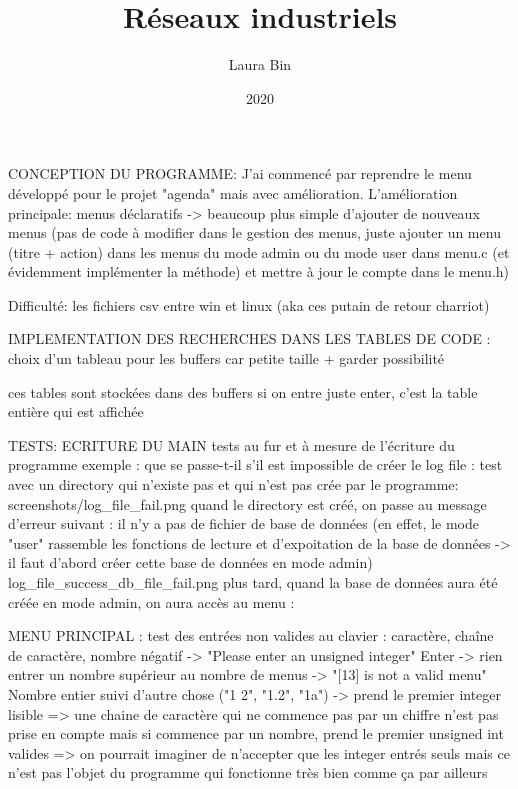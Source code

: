 \documentclass{article}
\title{Réseaux industriels}
\date{2020}
\author{Laura Bin}
\begin{document}

    CONCEPTION DU PROGRAMME:
    J'ai commencé par reprendre le menu développé pour le projet "agenda" mais avec amélioration. L'amélioration principale: menus déclaratifs -> beaucoup plus simple d'ajouter de nouveaux menus (pas de code à modifier dans le gestion des menus, juste ajouter un menu (titre + action) dans les menus du mode admin ou du mode user dans menu.c (et évidemment implémenter la méthode) et mettre à jour le compte dans le menu.h)

    Difficulté: les fichiers csv entre win et linux (aka ces putain de retour charriot)

    IMPLEMENTATION DES RECHERCHES DANS LES TABLES DE CODE :
    choix d'un tableau pour les buffers car petite taille + garder possibilité

    ces tables sont stockées dans des buffers
    si on entre juste enter, c'est la table entière qui est affichée




    TESTS:
ECRITURE DU MAIN
    tests au fur et à mesure de l'écriture du programme
    exemple : que se passe-t-il s'il est impossible de créer le log file :
    test avec un directory qui n'existe pas et qui n'est pas crée par le programme:
    screenshots/log_file_fail.png
    quand le directory est créé, on passe au message d'erreur suivant : il n'y a pas de fichier de base de données (en effet, le mode "user" rassemble les fonctions de lecture et d'expoitation de la base de données -> il faut d'abord créer cette base de données en mode admin)
    log_file_success_db_file_fail.png
    plus tard, quand la base de données aura été créée en mode admin, on aura accès au menu :

MENU PRINCIPAL :
    test des entrées non valides au clavier : caractère, chaîne de caractère, nombre négatif -> "Please enter an unsigned integer"
    Enter -> rien
    entrer un nombre supérieur au nombre de menus -> "[13] is not a valid menu"
    Nombre entier suivi d'autre chose ("1 2", "1.2", "1a") -> prend le premier integer lisible
    => une chaine de caractère qui ne commence pas par un chiffre n'est pas prise en compte mais si commence par un nombre, prend le premier unsigned int valides
    => on pourrait imaginer de n'accepter que les integer entrés seuls mais ce n'est pas l'objet du programme qui fonctionne très bien comme ça par ailleurs
\end{document}
